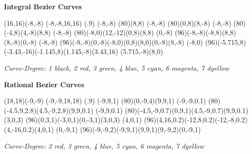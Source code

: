 



\begin{center}
{\Huge \bf{Integral Bezier Curves}}
\bigskip

\begin{lapdf}(16,16)(-8,-8)
 \Dgray
 \Rect(-8,-8,16,16) \Gfill(.9)
 \Black
 \Moveto(-8,-8)
 \Curveto(80)(8,8) \Stroke
 \Red
 \Moveto(-8,-8)
 \Curveto(80)(0,8)(8,-8) \Stroke
 \Green
 \Moveto(-8,-8)
 \Curveto(80)(-4,8)(4,-8)(8,8) \Stroke
 \Blue
 \Moveto(-8,-8)
 \Curveto(80)(-8,0)(12,-12)(0,8)(8,8) \Stroke
 \Cyan
 \Moveto(0,-8)
 \Curveto(96)(-8,-8)(-8,8)(8,8)(8,-8)(0,-8) \Stroke
 \Magenta
 \Moveto(-8,-8)
 \Curveto(96)(-8,-8)(0,-8)(-8,0)(0,8)(8,0)(0,-8)(8,-8) \Stroke
 \Yellow
 \Moveto(-8,0)
 \Curveto(96)(-5.715,8)(-3.43,-16)(-1.145,8)(1.145,-8)(3.43,16)
  (5.715,-8)(8,0) \Stroke
\end{lapdf}

\em{Curve-Degree: 1 black, 2 red, 3 green, 4 blue, 5 cyan, 6 magenta,
7 dyellow}
\end{center}

\newpage
{}

\begin{center}
{\Huge \bf{Rational Bezier Curves}}
\bigskip

\begin{lapdf}(18,18)(-9,-9)
 \Dgray
 \Rect(-9,-9,18,18) \Gfill(.9)
 \Red
 \Rmoveto(-9,9,1)
 \Rcurveto(80)(0,-9,4)(9,9,1) \Stroke
 \Green
 \Rmoveto(-9,-9,0.1)
 \Rcurveto(80)(-4.5,9,2.8)(4.5,-9,2.8)(9,9,0.1) \Stroke
 \Blue
 \Rmoveto(-9,9,0.1)
 \Rcurveto(80)(-4.5,-9,0.7)(0,9,1)(4.5,-9,0.7)(9,9,0.1) \Stroke
 \Cyan
 \Rmoveto(3,0,3)
 \Rcurveto(96)(0,3,1)(-3,0,1)(0,-3,1)(3,0,3) \Stroke
 \Magenta
 \Rmoveto(4,0,1)
 \Rcurveto(96)(4,16,0.2)(-12,8,0.2)(-12,-8,0.2)(4,-16,0.2)(4,0,1)
  \Stroke
 \Yellow
 \Rmoveto(0,-9,1)
 \Rcurveto(96)(-9,-9,2)(-9,9,1)(9,9,1)(9,-9,2)(0,-9,1) \Stroke
\end{lapdf}

\em{Curve-Degree: 2 red, 3 green, 4 blue, 5 cyan, 6 magenta, 7 dyellow}
\end{center}


